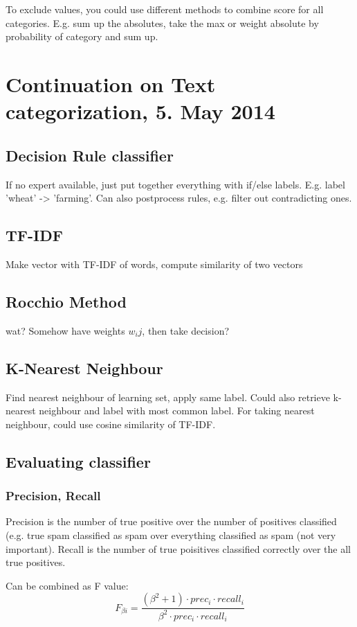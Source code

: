 \documentclass[11pt]{article}
\begin{document}
To exclude values, you could use different methods to combine score for all categories. E.g. sum up the absolutes, take the max or weight absolute by probability of category and sum up.

\section{Continuation on Text categorization, 5. May 2014}
\subsection{Decision Rule classifier}
If no expert available, just put together everything with if/else labels. E.g. label 'wheat' -> 'farming'. Can also postprocess rules, e.g. filter out contradicting ones. 

\subsection{TF-IDF }
Make vector with TF-IDF of words, compute similarity of two vectors

\subsection{Rocchio Method}
wat? Somehow have weights $w_ij$, then take decision?

\subsection{K-Nearest Neighbour}
Find nearest neighbour of learning set, apply same label. Could also retrieve k-nearest
neighbour and label with most common label. For taking nearest neighbour, could use cosine
similarity of TF-IDF.

\subsection{Evaluating classifier}
\subsubsection{Precision, Recall}
Precision is the number of true positive over the number of positives classified
(e.g. true spam classified as spam over everything classified as spam (not very important).
Recall is the number of true poisitives classified correctly over the all true positives.

Can be combined as F value:
\begin{equation}
	F_{\beta i} = \frac{(\beta^2 + 1)\cdot prec_i \cdot recall_i}{\beta^2 \cdot prec_i \cdot recall_i}
\end{equation}
\end{document}
